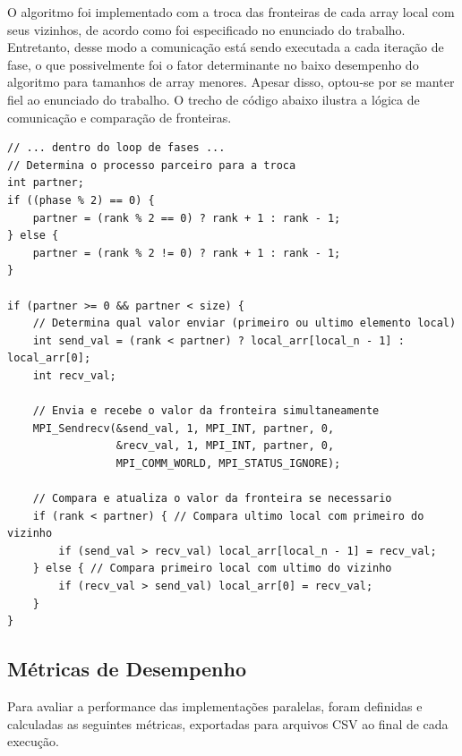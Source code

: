 \documentclass[12pt, a4paper]{article}
\begin{document}
O algoritmo foi implementado com a troca das fronteiras de cada array local com seus vizinhos, de acordo como foi especificado no enunciado do trabalho. Entretanto, desse modo a comunicação está sendo executada a cada iteração de fase, o que possivelmente foi o fator determinante no baixo desempenho do algoritmo para tamanhos de array menores. Apesar disso, optou-se por se manter fiel ao enunciado do trabalho. O trecho de código abaixo ilustra a lógica de comunicação e comparação de fronteiras.

\begin{lstlisting}[caption={Lógica de comunicação de fronteira na implementação MPI.}, label=lst:mpi]
// ... dentro do loop de fases ...
// Determina o processo parceiro para a troca
int partner;
if ((phase % 2) == 0) {
    partner = (rank % 2 == 0) ? rank + 1 : rank - 1;
} else {
    partner = (rank % 2 != 0) ? rank + 1 : rank - 1;
}

if (partner >= 0 && partner < size) {
    // Determina qual valor enviar (primeiro ou ultimo elemento local)
    int send_val = (rank < partner) ? local_arr[local_n - 1] : local_arr[0];
    int recv_val;
    
    // Envia e recebe o valor da fronteira simultaneamente
    MPI_Sendrecv(&send_val, 1, MPI_INT, partner, 0,
                 &recv_val, 1, MPI_INT, partner, 0,
                 MPI_COMM_WORLD, MPI_STATUS_IGNORE);

    // Compara e atualiza o valor da fronteira se necessario
    if (rank < partner) { // Compara ultimo local com primeiro do vizinho
        if (send_val > recv_val) local_arr[local_n - 1] = recv_val;
    } else { // Compara primeiro local com ultimo do vizinho
        if (recv_val > send_val) local_arr[0] = recv_val;
    }
}
\end{lstlisting}

\subsection{Métricas de Desempenho}
Para avaliar a performance das implementações paralelas, foram definidas e calculadas as seguintes métricas, exportadas para arquivos CSV ao final de cada execução.
\end{document}
